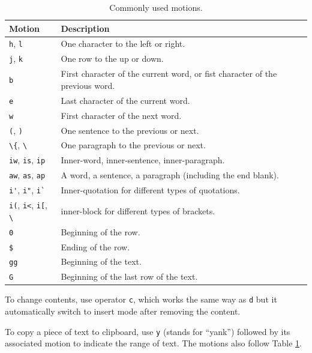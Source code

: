 \begin{table}
  \centering \caption{Commonly used motions.}\label{ch:tfe:tab:motion}
  \begin{tabularx}{\textwidth}{lX}
    \hline
    Motion & Description \\ \hline
    \verb|h|, \verb|l| & One character to the left or right. \\ \hdashline
    \verb|j|, \verb|k| & One row to the up or down. \\ \hdashline
    \verb|b| & First character of the current word, or fist character of the previous word. \\ \hdashline
    \verb|e| & Last character of the current word. \\ \hdashline
    \verb|w| & First character of the next word. \\ \hdashline
    \verb|(|, \verb|)| & One sentence to the previous or next. \\ \hdashline
    \lstinline{\{}, \lstinline{\}} & One paragraph to the previous or next. \\ \hdashline
    \verb|iw|, \verb|is|, \verb|ip| & Inner-word, inner-sentence, inner-paragraph. \\ \hdashline
    \verb|aw|, \verb|as|, \verb|ap| & A word, a sentence, a paragraph (including the end blank). \\ \hdashline
    \verb|i'|, \verb|i"|, \verb|i`| & Inner-quotation for different types of quotations. \\ \hdashline
    \verb|i(|, \verb|i<|, \verb|i[|, \lstinline{\}} & inner-block for different types of brackets. \\ \hdashline
    \verb|0| & Beginning of the row. \\ \hdashline
    \verb|$| & Ending of the row. \\ \hdashline
    \verb|gg| & Beginning of the text. \\ \hdashline
    \verb|G| & Beginning of the last row of the text. \\
    \hline
  \end{tabularx}
\end{table}

To change contents, use operator \verb|c|, which works the same way as \verb|d| but it automatically switch to insert mode after removing the content.

To copy a piece of text to clipboard, use \verb|y| (stands for ``yank'') followed by its associated motion to indicate the range of text. The motions also follow Table \ref{ch:tfe:tab:motion}.

